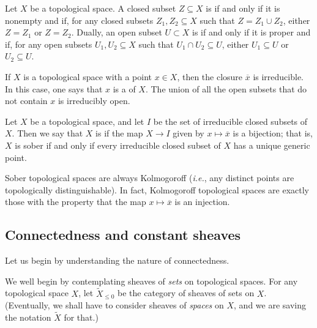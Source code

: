 \begin{dfn}
	Let $ X $ be a topological space.
	A closed subset $ Z \subseteq X $ is  if and only if it is nonempty and if, for any closed subsets $ Z_1, Z_2 \subseteq X $ such that $ Z = Z_1 \cup Z_2 $, either $ Z = Z_1 $ or $ Z = Z_2 $.
	Dually, an open subset $ U \subset X $ is  if and only if it is proper and if, for any open subsets $ U_1, U_2 \subseteq X $ such that $ U_1 \cap U_2 \subseteq U $, either $ U_1 \subseteq U $ or $ U_2 \subseteq U $.
\end{dfn}

\begin{exm}
	If $ X $ is a topological space with a point $ x \in X $, then the closure $ \overline{x} $ is irreducible.
	In this case, one says that $ x $ is a  of $ X $.
	The union of all the open subsets that do not contain $ x $ is irreducibly open.
\end{exm}

\begin{dfn}
	Let $ X $ be a topological space, and let $ I $ be the set of irreducible closed subsets of $ X $.
	Then we say that $ X $ is  if the map $ X \to I $ given by $ x \mapsto \overline{x} $ is a bijection;
	that is, $ X $ is sober if and only if every irreducible closed subset of $ X $ has a unique generic point.
\end{dfn}

\begin{nul}
	Sober topological spaces are always Kolmogoroff
	(\textit{i.e.}, any distinct points are topologically distinguishable).
	In fact, Kolmogoroff topological spaces are exactly those with the property that the map $ x \mapsto \overline{x} $ is an injection.
\end{nul}

\begin{cnstr}
	 
\end{cnstr}

\subsection*{Connectedness and constant sheaves}

Let us begin by understanding the nature of connectedness.

\begin{ntn}
	We well begin by contemplating sheaves of \emph{sets} on topological spaces.
	For any topological space $ X $, let $ \widetilde{X}_{\leq 0} $ be the category of sheaves of sets on $ X $.
	(Eventually, we shall have to consider sheaves of \emph{spaces} on $ X $, and we are saving the notation $ \widetilde{X} $ for that.)
\end{ntn}

